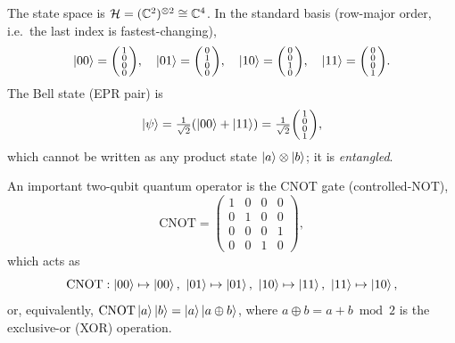 \begin{example}
The state space is $\mathcal{H} = (\mathbb{C}^2)^{\otimes 2} \cong \mathbb{C}^4$. In the standard basis
(row-major order, i.e.\ the last index is fastest-changing),
\begin{equation}
  \ket{00} = \begin{psmallmatrix} 1 \\ 0 \\ 0 \\ 0 \end{psmallmatrix}, \quad
  \ket{01} = \begin{psmallmatrix} 0 \\ 1 \\ 0 \\ 0 \end{psmallmatrix}, \quad
  \ket{10} = \begin{psmallmatrix} 0 \\ 0 \\ 1 \\ 0 \end{psmallmatrix}, \quad
  \ket{11} = \begin{psmallmatrix} 0 \\ 0 \\ 0 \\ 1 \end{psmallmatrix}.
\end{equation}
The Bell state (EPR pair) is
\begin{equation}
  \ket{\psi} = \tfrac{1}{\sqrt{2}}(\ket{00} + \ket{11})
  = \tfrac{1}{\sqrt{2}}\begin{psmallmatrix} 1 \\ 0 \\ 0 \\ 1 \end{psmallmatrix},
\end{equation}
which cannot be written as any product state $\ket{a} \otimes \ket{b}$; it is
\emph{entangled}.
\end{example}

An important two-qubit quantum operator is the CNOT gate (controlled-NOT),
\begin{equation}
  \mathrm{CNOT} = \begin{pmatrix}
    1 & 0 & 0 & 0 \\
    0 & 1 & 0 & 0 \\
    0 & 0 & 0 & 1 \\
    0 & 0 & 1 & 0
  \end{pmatrix},
\end{equation}
which acts as
\begin{equation}
  \mathrm{CNOT}: \ket{00} \mapsto \ket{00},\ \ket{01} \mapsto \ket{01},\
  \ket{10} \mapsto \ket{11},\ \ket{11} \mapsto \ket{10},
\end{equation}
or, equivalently, $\mathrm{CNOT}\ket{a}\ket{b} = \ket{a}\ket{a \oplus b}$, where
$a \oplus b = a + b \bmod 2$ is the exclusive-or (XOR) operation.

